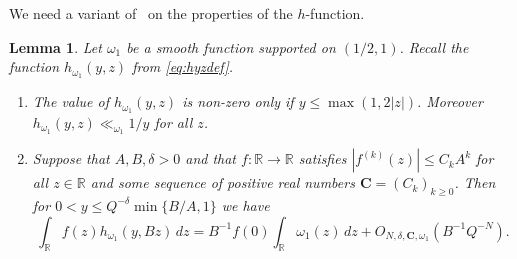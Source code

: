 \documentclass[letterpaper,11pt]{amsart}
\numberwithin{equation}{section}
\newtheorem{lemma}[theorem]{Lemma}
\theoremstyle{definition}
\numberwithin{equation}{section}
\newcommand{\R}{\mathbb{R}}
\begin{document}
We need a variant of~\cite[Lemmas 4 and 9]{Heath-Brown96} on the properties of the $h$-function. 

\begin{lemma}\label{lem:HB}
	Let $\omega_1$ be a
    smooth function supported on $(1/2, 1)$. Recall the function $h_{\omega_1}(y,z)$ from \eqref{eq:hyzdef}.
    \begin{enumerate}
        \item 
    The value of $h_{\omega_1}(y,z)$ is non-zero only if  $y\leq \max (1, 2|z|)$. Moreover $h_{\omega_1}(y,z)\ll_{\omega_1} 1/y$ for all $z$.
    \item
    Suppose that \(A,B, \delta>0\) and that \(f:\R\to \R\) satisfies \(|f^{(k)}(z)|\leq C_k A^k\) for all \(z\in \R\) and some sequence of positive real numbers \(\boldsymbol{C}=(C_k)_{k\geq 0}\). 
    Then for \(0<y\leq Q^{-\delta}\min\{B/A,1\}\) we have
	\[
	\int_{\R} f(z)h_{\omega_1}(y,Bz)\,dz
	= B^{-1}f(0)\int_{\R}\omega_1(z)\,dz
	+O_{N,\delta,\boldsymbol{C},\omega_1}(B^{-1}Q^{-N}).
	\]
    \end{enumerate}
\end{lemma}
\end{document}
